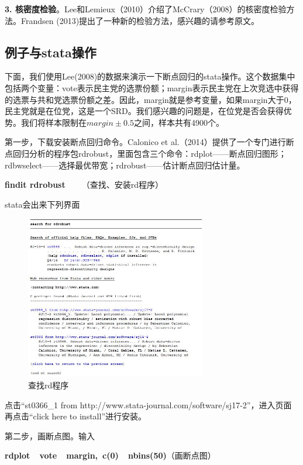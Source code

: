 \documentclass[cn,12pt,math=newtx,citestyle=gb7714-2015,bibstyle=gb7714-2015]{elegantbook}
\begin{document}
	\textbf{3. 核密度检验}。Lee和Lemieux（2010）介绍了McCrary（2008）的核密度检验方法。Frandsen (2013)提出了一种新的检验方法，感兴趣的请参考原文。
	
	\subsection{例子与stata操作}
	
	下面，我们使用Lee(2008)的数据来演示一下断点回归的stata操作。这个数据集中包括两个变量：vote表示民主党的选票份额；margin表示民主党在上次竞选中获得的选票与共和党选票份额之差。因此，margin就是参考变量，如果margin大于0，民主党就是在位党，这是一个SRD。我们感兴趣的问题是，在位党是否会获得优势。我们将样本限制在$margin\pm0.5$之间，样本共有4900个。
	
	第一步，下载安装断点回归命令。Calonico et al.（2014）提供了一个专门进行断点回归分析的程序包rdrobust，里面包含三个命令：rdplot——断点回归图形；rdbwselect——选择最优带宽；rdrobust——估计断点回归估计量。
	
	\textbf{findit rdrobust}~~~~（查找、安装rd程序）
	
	stata会出来下列界面
	
	\begin{figure}[htbp]
		\centering
		\includegraphics[width=0.7\textwidth]{findit.jpg}
		\caption{查找rd程序}\label{fig:digit}
	\end{figure}
	
	点击“st0366\_1 from http://www.stata-journal.com/software/sj17-2”，进入页面再点击“click here to install”进行安装。
	
	第二步，画断点图。输入
	
	\textbf{rdplot~~vote~~margin,~c(0)~~nbins(50)}（画断点图）
	
\end{document}
